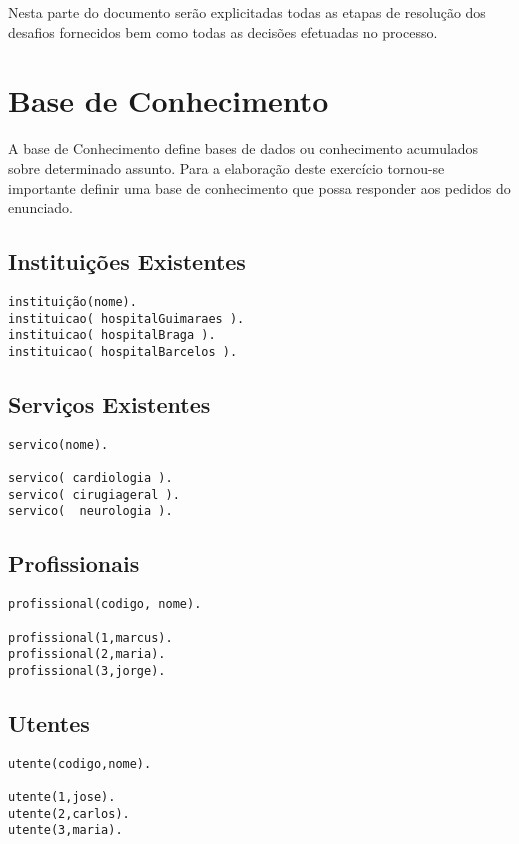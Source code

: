 Nesta parte do documento serão explicitadas todas as etapas de resolução dos desafios fornecidos bem como todas as decisões efetuadas no processo.


\section{Base de Conhecimento}
\label{p3:baseConhe}

A base de Conhecimento define bases de dados ou conhecimento acumulados sobre determinado assunto.
Para a elaboração deste exercício tornou-se importante definir uma base de conhecimento
que possa responder aos pedidos do enunciado.

\subsection{Instituições Existentes }

\begin{verbatim}
instituição(nome). 
instituicao( hospitalGuimaraes ). 
instituicao( hospitalBraga ).
instituicao( hospitalBarcelos ).
\end{verbatim}

\subsection{Serviços Existentes}

\begin{Verbatim}
servico(nome).

servico( cardiologia ). 
servico( cirugiageral ).
servico(  neurologia ).
\end{Verbatim}

\subsection{Profissionais}
\begin{Verbatim}
profissional(codigo, nome).

profissional(1,marcus).
profissional(2,maria).
profissional(3,jorge).
\end{Verbatim}

\subsection{Utentes }

\begin{Verbatim}
utente(codigo,nome).

utente(1,jose).  
utente(2,carlos). 
utente(3,maria). 
\end{Verbatim}

